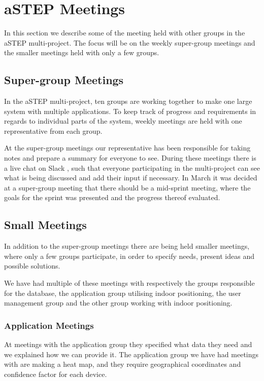 \section{aSTEP Meetings}
In this section we describe some of the meeting held with other groups in the aSTEP multi-project. The focus will be on the weekly super-group meetings and the smaller meetings held with only a few groups.

\subsection*{Super-group Meetings}\label{subsec:supergroup_meetings}
In the aSTEP multi-project, ten groups are working together to make one large system with multiple applications. To keep track of progress and requirements in regards to individual parts of the system, weekly meetings are held with one representative from each group.

At the super-group meetings our representative has been responsible for taking notes and prepare a summary for everyone to see. During these meetings there is a live chat on Slack \cite{slack}, such that everyone participating in the multi-project can see what is being discussed and add their input if necessary. In March it was decided at a super-group meeting that there should be a mid-sprint meeting, where the goals for the sprint was presented and the progress thereof evaluated.

\subsection*{Small Meetings}\label{subsec:small_meetings}
In addition to the super-group meetings there are being held smaller meetings, where only a few groups participate, in order to specify needs, present ideas and possible solutions.

We have had multiple of these meetings with respectively the groups responsible for the database, the application group utilising indoor positioning, the user management group and the other group working with indoor positioning.
 
\subsubsection*{Application Meetings}
At meetings with the application group they specified what data they need and we explained how we can provide it. The application group we have had meetings with are making a heat map, and they require geographical coordinates and confidence factor for each device.

